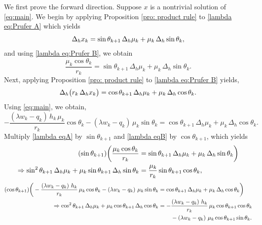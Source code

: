 \documentclass[12pt,reqno]{amsart}
\numberwithin{equation}{section}
\begin{document}
We first prove the forward direction. Suppose $x$ is a nontrivial solution of \eqref{eq:main}. We begin by applying Proposition \ref{pro: product rule} to \eqref{lambda eq:Prufer A} which yields
\begin{equation}
\Delta_h x_k
= \sin\theta_{k+1}\,\Delta_h\mu_k + \mu_k\,\Delta_h\sin\theta_k, \notag
\end{equation}
and using \eqref{lambda eq:Prufer B}, we obtain
\begin{equation}
\frac{\mu_k\cos\theta_k}{r_k}
= \sin\theta_{k+1}\,\Delta_h\mu_k + \mu_k\,\Delta_h\sin\theta_k .\label{lambda eqA}
\end{equation}
Next, applying Proposition \ref{pro: product rule} to \eqref{lambda eq:Prufer B} yields, 
\begin{equation}
\Delta_h\bigl(r_k\,\Delta_h x_k\bigr)
= \cos\theta_{k+1}\,\Delta_h\mu_k + \mu_k\,\Delta_h\cos\theta_k . \notag
\end{equation}
Using \eqref{eq:main}, we obtain,
\begin{equation}
-\frac{\left(\lambda w_k-q_k\right)\, h_k\, \mu_k}{r_k}\cos\theta_k
- \left(\lambda w_k-q_k\right)\,\mu_k\sin\theta_k
= \cos\theta_{k+1}\,\Delta_h\mu_k + \mu_k\,\Delta_h\cos\theta_k .\label{lambda eqB}
\end{equation}
Multiply
\eqref{lambda eqA} by $\sin\theta_{k+1}$ and \eqref{lambda eqB} by $\cos\theta_{k+1}$, which yields
\begin{align}
(\sin\theta_{k+1})\bigg(\frac{\mu_k\cos\theta_k}{r_k}
&= \sin\theta_{k+1}\,\Delta_h\mu_k + \mu_k\,\Delta_h\sin\theta_k\bigg) \notag \\ 
\Rightarrow \sin^2\theta_{k+1}\,\Delta_h\mu_k
+ \mu_k\sin\theta_{k+1}\,\Delta_h\sin\theta_k
&= \frac{\mu_k}{r_k}\sin\theta_{k+1}\cos\theta_k,
\label{lambda eq:3.8}
\end{align}
\begin{align}
(\cos\theta_{k+1})\bigg(-\frac{\left(\lambda w_k-q_k\right)\, h_k}{r_k}\,\mu_k\cos\theta_k
- \left(\lambda w_k-q_k\right)\,\mu_k\sin\theta_k
&= \cos\theta_{k+1}\,\Delta_h\mu_k + \mu_k\,\Delta_h\cos\theta_k\bigg) \notag \\
\Rightarrow \cos^2\theta_{k+1}\,\Delta_h\mu_k
+ \mu_k\cos\theta_{k+1}\,\Delta_h\cos\theta_k
&= -\frac{\left(\lambda w_k-q_k\right)\, h_k}{r_k}\,\mu_k\cos\theta_{k+1}\cos\theta_k \notag
\\ &\hspace{0.75cm}- \left(\lambda w_k-q_k\right)\,\mu_k\cos\theta_{k+1}\sin\theta_k .
\label{lambda eq:3.9}
\end{align}
\end{document}
